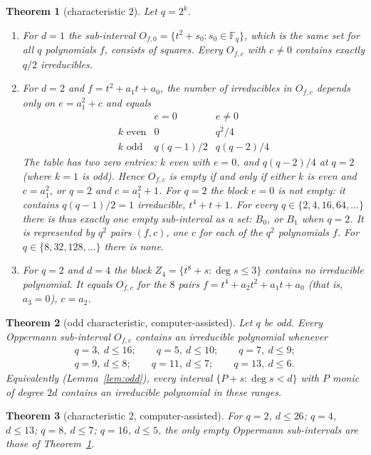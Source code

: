 \documentclass[11pt,a4paper]{amsart}
\newtheorem{theorem}{Theorem}[section]
\theoremstyle{definition}
\theoremstyle{remark}
\newcommand{\F}{\mathbb{F}}
\begin{document}
\begin{theorem}[characteristic $2$]\label{thm:main2}
Let $q=2^k$.
\begin{enumerate}
\item[(A)] For $d=1$ the sub-interval $O_{f,0}=\{t^2+s_0:s_0\in\F_q\}$, which is the same set for all $q$
polynomials $f$, consists of squares. Every $O_{f,c}$ with $c\ne0$ contains exactly $q/2$ irreducibles.
\item[(B)] For $d=2$ and $f=t^2+a_1t+a_0$, the number of irreducibles in $O_{f,c}$ depends only on $e=a_1^2+c$ and
equals
\[
\begin{array}{c|cc}
 & e=0 & e\ne0\\\hline
k\text{ even} & 0 & q^2/4\\
k\text{ odd} & q(q-1)/2 & q(q-2)/4
\end{array}
\]
The table has two zero entries: $k$ even with $e=0$, and $q(q-2)/4$ at $q=2$ (where $k=1$ is odd). Hence
$O_{f,c}$ is empty if and only if either $k$ is even and $c=a_1^2$, or $q=2$ and $c=a_1^2+1$. For $q=2$ the block
$e=0$ is \emph{not} empty: it contains $q(q-1)/2=1$ irreducible, $t^4+t+1$. For every
$q\in\{2,4,16,64,\dots\}$ there is thus exactly one empty sub-interval as a set: $B_0$, or $B_1$ when $q=2$. It is
represented by $q^2$ pairs $(f,c)$, one $c$ for each of the $q^2$ polynomials $f$. For $q\in\{8,32,128,\dots\}$
there is none.
\item[(C)] For $q=2$ and $d=4$ the block $Z_4=\{t^8+s:\deg s\le3\}$ contains no irreducible polynomial. It equals
$O_{f,c}$ for the $8$ pairs $f=t^4+a_2t^2+a_1t+a_0$ (that is, $a_3=0$), $c=a_2$.
\end{enumerate}
\end{theorem}

\begin{theorem}[odd characteristic, computer-assisted]\label{thm:odd}
Let $q$ be odd. Every Oppermann sub-interval $O_{f,c}$ contains an irreducible polynomial whenever
\[
\begin{gathered}q=3,\ d\le16;\qquad q=5,\ d\le10;\qquad q=7,\ d\le9;\\ q=9,\ d\le8;\qquad q=11,\ d\le7;\qquad q=13,\ d\le6.\end{gathered}
\]
Equivalently (Lemma~\ref{lem:odd}), every interval $\{P+s:\deg s<d\}$ with $P$ monic of degree $2d$ contains an
irreducible polynomial in these ranges.
\end{theorem}

\begin{theorem}[characteristic $2$, computer-assisted]\label{thm:even}
For $q=2$, $d\le26$; $q=4$, $d\le13$; $q=8$, $d\le7$; $q=16$, $d\le5$, the only empty Oppermann sub-intervals are
those of Theorem~\ref{thm:main2}.
\end{theorem}
\end{document}
